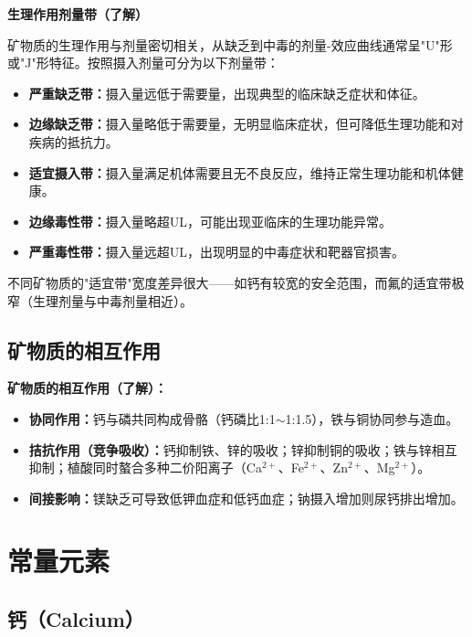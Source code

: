 \begin{tipbox}
\textbf{生理作用剂量带（了解）}

矿物质的生理作用与剂量密切相关，从缺乏到中毒的剂量-效应曲线通常呈"U"形或"J"形特征。按照摄入剂量可分为以下剂量带：
\begin{itemize}[leftmargin=*]
    \item \textbf{严重缺乏带：}摄入量远低于需要量，出现典型的临床缺乏症状和体征。
    \item \textbf{边缘缺乏带：}摄入量略低于需要量，无明显临床症状，但可降低生理功能和对疾病的抵抗力。
    \item \textbf{适宜摄入带：}摄入量满足机体需要且无不良反应，维持正常生理功能和机体健康。
    \item \textbf{边缘毒性带：}摄入量略超UL，可能出现亚临床的生理功能异常。
    \item \textbf{严重毒性带：}摄入量远超UL，出现明显的中毒症状和靶器官损害。
\end{itemize}

不同矿物质的"适宜带"宽度差异很大——如钙有较宽的安全范围，而氟的适宜带极窄（生理剂量与中毒剂量相近）。
\end{tipbox}

\subsection{矿物质的相互作用}

\begin{tipbox}
\textbf{矿物质的相互作用（了解）：}
\begin{itemize}[leftmargin=*]
    \item \textbf{协同作用：}钙与磷共同构成骨骼（钙磷比1:1$\sim$1:1.5），铁与铜协同参与造血。
    \item \textbf{拮抗作用（竞争吸收）：}钙抑制铁、锌的吸收；锌抑制铜的吸收；铁与锌相互抑制；植酸同时螯合多种二价阳离子（Ca$^{2+}$、Fe$^{2+}$、Zn$^{2+}$、Mg$^{2+}$）。
    \item \textbf{间接影响：}镁缺乏可导致低钾血症和低钙血症；钠摄入增加则尿钙排出增加。
\end{itemize}
\end{tipbox}

\section{常量元素}

\subsection{钙（Calcium）}

